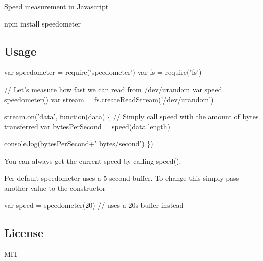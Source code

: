 Speed measurement in Javascript


\begin{DoxyCode}
npm install speedometer
\end{DoxyCode}


\subsection*{Usage}


\begin{DoxyCode}
var speedometer = require('speedometer')
var fs = require('fs')

// Let's measure how fast we can read from /dev/urandom
var speed = speedometer()
var stream = fs.createReadStream('/dev/urandom')

stream.on('data', function(data) \{
  // Simply call speed with the amount of bytes transferred
  var bytesPerSecond = speed(data.length)

  console.log(bytesPerSecond+' bytes/second')
\})
\end{DoxyCode}


You can always get the current speed by calling {\ttfamily speed()}.

Per default {\ttfamily speedometer} uses a 5 second buffer. To change this simply pass another value to the constructor


\begin{DoxyCode}
var speed = speedometer(20) // uses a 20s buffer instead
\end{DoxyCode}


\subsection*{License}

M\+IT 
